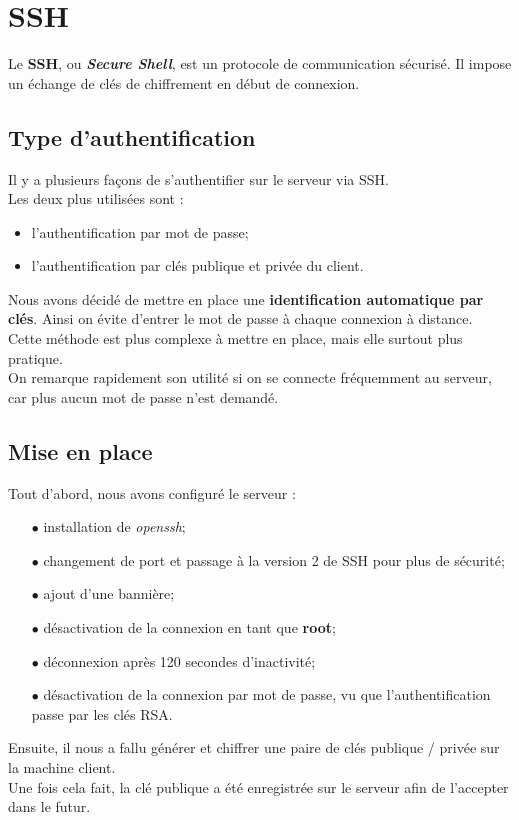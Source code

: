 \section{SSH}
\label{sec:ssh}

Le \textbf{SSH}, ou \textit{\textbf{Secure Shell}}, est un protocole de
communication sécurisé. Il impose un échange de clés de chiffrement en début de
connexion.


\subsection{Type d'authentification}
\label{subsec:type-authentification}

Il y a plusieurs façons de s'authentifier sur le serveur via SSH. \\
Les deux plus utilisées sont :
\begin{itemize}
    \item l'authentification par mot de passe;
    \item l'authentification par clés publique et privée du client. \\
\end{itemize}

Nous avons décidé de mettre en place une \textbf{identification automatique par
clés}. Ainsi on évite d'entrer le mot de passe à chaque connexion à distance. \\
Cette méthode est plus complexe à mettre en place, mais elle surtout plus
pratique. \\

On remarque rapidement son utilité si on se connecte fréquemment au serveur, car
plus aucun mot de passe n'est demandé.


\subsection{Mise en place}
\label{subsec:mise-en-place}

Tout d'abord, nous avons configuré le serveur :
\begin{itemize}

    \item[$\bullet$] installation de \textit{openssh};
    \item[$\bullet$] changement de port et passage à la version 2 de SSH pour plus de
    sécurité;
    \item[$\bullet$] ajout d'une bannière;
    \item[$\bullet$] désactivation de la connexion en tant que \textbf{root};
    \item[$\bullet$] déconnexion après 120 secondes d'inactivité;
    \item[$\bullet$] désactivation de la connexion par mot de passe, vu que l'authentification
    passe par les clés RSA. \\

\end{itemize}

Ensuite, il nous a fallu générer et chiffrer une paire de clés publique /
privée sur la machine client. \\
Une fois cela fait, la clé publique a été enregistrée sur le serveur afin de
l'accepter dans le futur.
